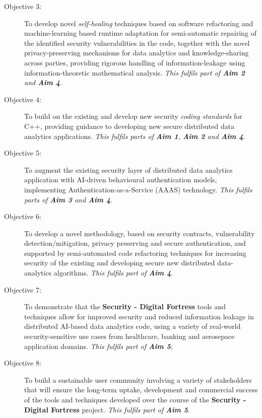 \documentclass[a4paper,11pt]{article}
\newcommand{\project}[1]{\textbf{#1}\xspace}
\newcommand{\SECURITY}{\project{Security - Digital Fortress}}
\newcommand{\TheProject}{\SECURITY}
\begin{document}
\begin{description}
\item[Objective 3:] To develop novel \emph{self-healing} techniques based on software refactoring and machine-learning based runtime adaptation for semi-automatic repairing of the identified security vulnerabilities in the code, together with the novel privacy-preserving mechanisms for data analytics and knowledge-sharing across parties, providing rigorous handling of information-leakage using information-theoretic mathematical analysis. \emph{This fulfils part of \textbf{Aim 2} and \textbf{Aim 4}}.

\item[Objective 4:] To build on the existing and develop new security \emph{coding standards} for C++, providing guidance to developing new secure distributed data analytics applications. \emph{This fulfils parts of \textbf{Aim 1}, \textbf{Aim 2} and \textbf{Aim 4}}.

\item[Objective 5:] To augment the existing security layer of distributed data analytics application with AI-driven behavioural authentication models, implementing Authentication-as-a-Service (AAAS) technology. \emph{This fulfils parts of \textbf{Aim 3} and \textbf{Aim 4}}.

\item[Objective 6:] To develop a novel methodology, based on security contracts, vulnerability detection/mitigation,
  privacy preserving and secure authentication, and supported by semi-automated code refactoring techniques for
  increasing security of the existing and developing secure new distributed data-analytics algorithms. \emph{This fulfils
    part of \textbf{Aim 4}}.

\item[Objective 7:] To demonstrate that the \TheProject{} tools and techniques allow for improved security and reduced
  information leakage in distributed AI-based data analytics code, using a variety of real-world security-sensitive
  use cases from healthcare, banking and aerosepace application domains. \emph{This fulfils part of \textbf{Aim 5}};

\item[Objective 8:] To build a sustainable user community involving a variety of stakeholders that will ensure the long-term
  uptake, development and commercial success of the tools and techniques developed over the course of the \TheProject{}
  project. \emph{This fulfils part of \textbf{Aim 5}}.

\end{description}
\end{document}
